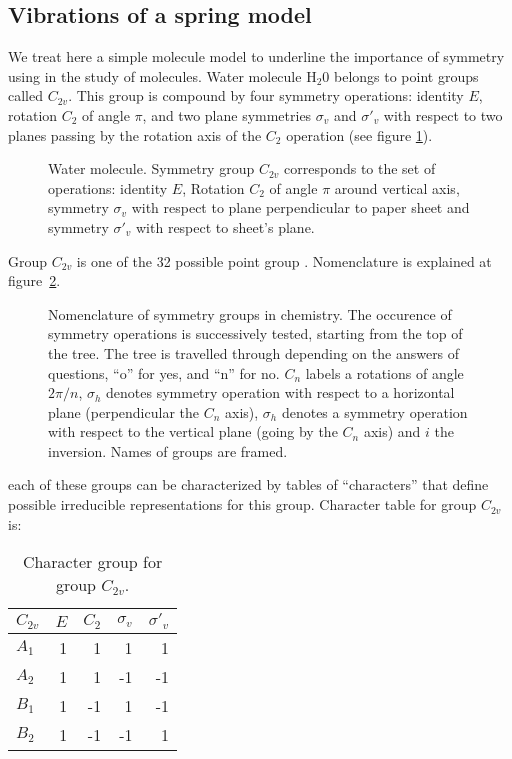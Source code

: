 \documentclass[12pt]{book}
\begin{document}
\subsection{Vibrations of a spring model}
We treat here a simple molecule model  to underline the
importance of symmetry using  in the study of molecules.
Water molecule H$_2$0 belongs to point groups called $C_{2v}$. This group is
compound by four symmetry operations: identity $E$, rotation $C_2$ of angle
$\pi$, and two plane symmetries $\sigma_v$ and
$\sigma'_v$ with respect to two planes passing by the rotation axis of the
$C_2$ operation (see figure \ref{figmoleceau}).
\begin{figure}[htb]
 \centerline{}   
 \caption{Water molecule. Symmetry group $C_{2v}$ corresponds to the set of
   operations: identity $E$, Rotation $C_2$ of angle $\pi$ around vertical
   axis, symmetry $\sigma_v$ with respect to plane perpendicular to paper sheet
   and symmetry $\sigma'_v$ with respect to sheet's plane.}
 \label{figmoleceau}
\end{figure}
Group $C_{2v}$ is one of the 32 possible point group
\cite{ma:group:Jones90,ph:solid:Ashcroft76}. Nomenclature is explained at
figure~\ref{figsymetr}. 
\begin{figure}[htb]
\centerline{}   
 \caption{Nomenclature of symmetry groups in chemistry. The occurence of
   symmetry operations is successively tested, starting from the top of the
   tree. The tree is travelled through depending on the answers of questions,
   ``o'' for yes, and ``n'' for no. $C_n$ labels a rotations of angle
$2\pi/n$, $\sigma_h$ denotes symmetry operation with respect to a horizontal
plane (perpendicular the $C_n$ axis),
$\sigma_h$ denotes a symmetry operation with respect to the vertical plane
(going by the $C_n$ axis) and $i$ the inversion. Names of groups are framed.}
 \label{figsymetr}

\end{figure}
each of these groups can be characterized by tables of ``characters'' that
define possible irreducible representations
for this group. Character table for group $C_{2v}$ is:
\begin{table}[hbt]\label{tabchar}
\caption{Character group for group $C_{2v}$.}
\begin{center}
\begin{tabular}{|l|r|r|r|r|}
$C_{2v}$ & $E$ & $C_2$ & $\sigma_v$ & $\sigma'_v$\\
\hline
$A_1$&1&1&1&1\\
$A_2$&1&1&-1&-1\\
$B_1$&1&-1&1&-1\\
$B_2$&1&-1&-1&1\\
\end{tabular}
\end{center}
\end{table}
\end{document}
